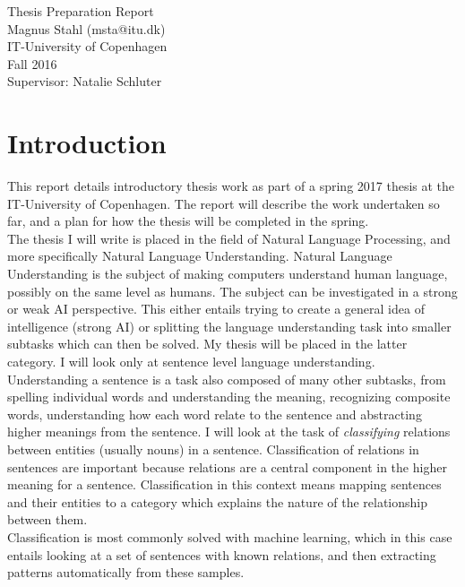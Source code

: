 \documentclass[12pt]{article}
\begin{document}
\begin{center}
    \vspace{2cm}
    \huge { Thesis Preparation Report \\ }
    \vspace{2cm}
    \large {Magnus Stahl (msta@itu.dk)\\
    IT-University of Copenhagen\\
    Fall 2016\\}
    \large {Supervisor: Natalie Schluter\\}
\end{center}


\tableofcontents

\newpage

    
\section{Introduction}
\label{intro}

This report details introductory thesis work as part of a spring 2017 thesis at the IT-University of Copenhagen. The report will describe the work undertaken so far, and a plan for how the thesis will be completed in the spring. \\

The thesis I will write is placed in the field of Natural Language Processing, and more specifically Natural Language Understanding. Natural Language Understanding is the subject of making computers understand human language, possibly on the same level as humans. The subject can be investigated in a strong or weak AI perspective. This either entails trying to create a general idea of intelligence (strong AI) or splitting the language understanding task into smaller subtasks which can then be solved. My thesis will be placed in the latter category. I will look only at sentence level language understanding. Understanding a sentence is a task also composed of many other subtasks, from spelling individual words and understanding the meaning, recognizing composite words, understanding how each word relate to the sentence and abstracting higher meanings from the sentence. I will look at the task of \emph{classifying} relations between entities (usually nouns) in a sentence. Classification of relations in sentences are important because relations are a central component in the higher meaning for a sentence. Classification in this context means mapping sentences and their entities to a category which explains the nature of the relationship between them. \\
Classification is most commonly solved with machine learning, which in this case entails looking at a set of sentences with known relations, and then extracting patterns automatically from these samples. 
\end{document}
